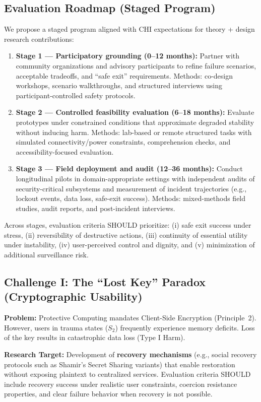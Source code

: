 \documentclass[12pt]{article}
\begin{document}
\subsection{Evaluation Roadmap (Staged Program)}
We propose a staged program aligned with CHI expectations for theory + design research contributions:
\begin{enumerate}
\item \textbf{Stage 1 --- Participatory grounding (0--12 months):} Partner with community organizations and advisory participants to refine failure scenarios, acceptable tradeoffs, and ``safe exit'' requirements. Methods: co-design workshops, scenario walkthroughs, and structured interviews using participant-controlled safety protocols.
\item \textbf{Stage 2 --- Controlled feasibility evaluation (6--18 months):} Evaluate prototypes under constrained conditions that approximate degraded stability without inducing harm. Methods: lab-based or remote structured tasks with simulated connectivity/power constraints, comprehension checks, and accessibility-focused evaluation.
\item \textbf{Stage 3 --- Field deployment and audit (12--36 months):} Conduct longitudinal pilots in domain-appropriate settings with independent audits of security-critical subsystems and measurement of incident trajectories (e.g., lockout events, data loss, safe-exit success). Methods: mixed-methods field studies, audit reports, and post-incident interviews.
\end{enumerate}

Across stages, evaluation criteria SHOULD prioritize: (i) safe exit success under stress, (ii) reversibility of destructive actions, (iii) continuity of essential utility under instability, (iv) user-perceived control and dignity, and (v) minimization of additional surveillance risk.

\subsection{Challenge I: The ``Lost Key'' Paradox (Cryptographic Usability)}
\textbf{Problem:} Protective Computing mandates Client-Side Encryption (Principle~2). However, users in trauma states ($S_2$) frequently experience memory deficits. Loss of the key results in catastrophic data loss (Type I Harm).

\textbf{Research Target:} Development of \textbf{recovery mechanisms} (e.g., social recovery protocols such as Shamir's Secret Sharing variants) that enable restoration without exposing plaintext to centralized services. Evaluation criteria SHOULD include recovery success under realistic user constraints, coercion resistance properties, and clear failure behavior when recovery is not possible.
\end{document}
